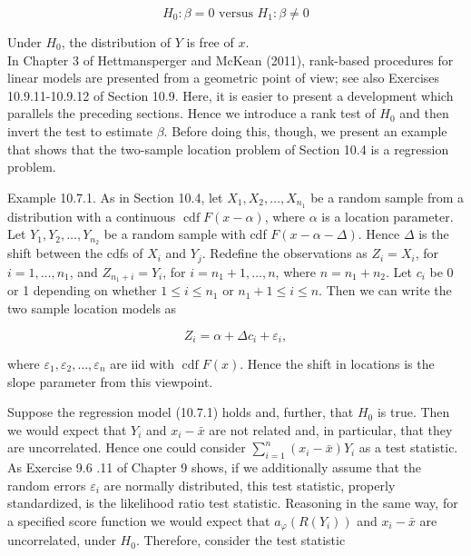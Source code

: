 \begin{equation*}
H_{0}: \beta=0 \text { versus } H_{1}: \beta \neq 0 \tag{10.7.2}
\end{equation*}


Under $H_{0}$, the distribution of $Y$ is free of $x$.\\
In Chapter 3 of Hettmansperger and McKean (2011), rank-based procedures for linear models are presented from a geometric point of view; see also Exercises 10.9.11-10.9.12 of Section 10.9. Here, it is easier to present a development which parallels the preceding sections. Hence we introduce a rank test of $H_{0}$ and then invert the test to estimate $\beta$. Before doing this, though, we present an example that shows that the two-sample location problem of Section 10.4 is a regression problem.

Example 10.7.1. As in Section 10.4, let $X_{1}, X_{2}, \ldots, X_{n_{1}}$ be a random sample from a distribution with a continuous $\operatorname{cdf} F(x-\alpha)$, where $\alpha$ is a location parameter. Let $Y_{1}, Y_{2}, \ldots, Y_{n_{2}}$ be a random sample with cdf $F(x-\alpha-\Delta)$. Hence $\Delta$ is the shift between the cdfs of $X_{i}$ and $Y_{j}$. Redefine the observations as $Z_{i}=X_{i}$, for\\
$i=1, \ldots, n_{1}$, and $Z_{n_{1}+i}=Y_{i}$, for $i=n_{1}+1, \ldots, n$, where $n=n_{1}+n_{2}$. Let $c_{i}$ be 0 or 1 depending on whether $1 \leq i \leq n_{1}$ or $n_{1}+1 \leq i \leq n$. Then we can write the two sample location models as


\begin{equation*}
Z_{i}=\alpha+\Delta c_{i}+\varepsilon_{i}, \tag{10.7.3}
\end{equation*}


where $\varepsilon_{1}, \varepsilon_{2}, \ldots, \varepsilon_{n}$ are iid with $\operatorname{cdf} F(x)$. Hence the shift in locations is the slope parameter from this viewpoint.

Suppose the regression model (10.7.1) holds and, further, that $H_{0}$ is true. Then we would expect that $Y_{i}$ and $x_{i}-\bar{x}$ are not related and, in particular, that they are uncorrelated. Hence one could consider $\sum_{i=1}^{n}\left(x_{i}-\bar{x}\right) Y_{i}$ as a test statistic. As Exercise 9.6 .11 of Chapter 9 shows, if we additionally assume that the random errors $\varepsilon_{i}$ are normally distributed, this test statistic, properly standardized, is the likelihood ratio test statistic. Reasoning in the same way, for a specified score function we would expect that $a_{\varphi}\left(R\left(Y_{i}\right)\right)$ and $x_{i}-\bar{x}$ are uncorrelated, under $H_{0}$. Therefore, consider the test statistic


